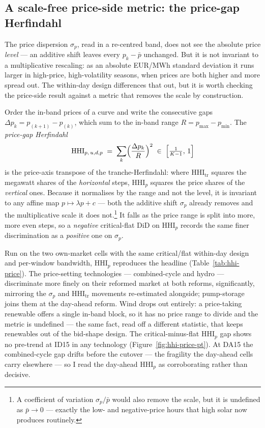 \documentclass[11pt,a4paper]{article}
\theoremstyle{definition}
\theoremstyle{remark}
\theoremstyle{plain}
\begin{document}
\subsection{A scale-free price-side metric: the price-gap Herfindahl}\label{sec:5-hhi-price}

The price dispersion $\sigma_p$, read in a re-centred band, does not see the absolute price \emph{level} --- an additive shift leaves every $p_k-\bar p$ unchanged. But it is not invariant to a multiplicative rescaling: as an absolute EUR/MWh standard deviation it runs larger in high-price, high-volatility seasons, when prices are both higher and more spread out. The within-day design differences that out, but it is worth checking the price-side result against a metric that removes the scale by construction.

Order the in-band prices of a curve and write the consecutive gaps $\Delta p_k = p_{(k+1)}-p_{(k)}$, which sum to the in-band range $R = p_{\max}-p_{\min}$. The \emph{price-gap Herfindahl}
\[
\text{HHI}_{p,\,u,d,p} \;=\; \sum_k \Bigl(\frac{\Delta p_k}{R}\Bigr)^2 \;\in\; \Bigl[\tfrac{1}{K-1},\,1\Bigr]
\]
is the price-axis transpose of the tranche-Herfindahl: where $\text{HHI}_{\text{tr}}$ squares the megawatt shares of the \emph{horizontal} steps, $\text{HHI}_{p}$ squares the price shares of the \emph{vertical} ones. Because it normalises by the range and not the level, it is invariant to any affine map $p\mapsto\lambda p + c$ --- both the additive shift $\sigma_p$ already removes and the multiplicative scale it does not.\footnote{A coefficient of variation $\sigma_p/\bar p$ would also remove the scale, but it is undefined as $\bar p\to 0$ --- exactly the low- and negative-price hours that high solar now produces routinely.} It falls as the price range is split into more, more even steps, so a \emph{negative} critical-flat DiD on $\text{HHI}_p$ records the same finer discrimination as a \emph{positive} one on $\sigma_p$.

Run on the two own-market cells with the same critical/flat within-day design and per-window bandwidth, $\text{HHI}_p$ reproduces the headline (Table~\ref{tab:hhi-price}). The price-setting technologies --- combined-cycle and hydro --- discriminate more finely on their reformed market at both reforms, significantly, mirroring the $\sigma_p$ and $\text{HHI}_{\text{tr}}$ movements re-estimated alongside; pump-storage joins them at the day-ahead reform. Wind drops out entirely: a price-taking renewable offers a single in-band block, so it has no price range to divide and the metric is undefined --- the same fact, read off a different statistic, that keeps renewables out of the bid-shape design. The critical-minus-flat $\text{HHI}_p$ gap shows no pre-trend at ID15 in any technology (Figure~\ref{fig:hhi-price-pt}). At DA15 the combined-cycle gap drifts before the cutover --- the fragility the day-ahead cells carry elsewhere --- so I read the day-ahead $\text{HHI}_p$ as corroborating rather than decisive.
\end{document}

